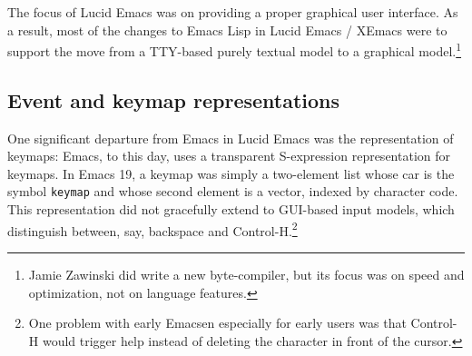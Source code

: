 \documentclass[format=acmsmall, review=false, screen=true]{acmart}
\begin{document}
The focus of Lucid Emacs was on providing a proper graphical user
interface.  As a result, most of the changes to Emacs Lisp in Lucid
Emacs / XEmacs were to support the move from a TTY-based purely
textual model to a graphical model.\footnote{Jamie Zawinski did write a new
  byte-compiler, but its focus was on speed and optimization, not on
  language features.}

\subsection{Event and keymap representations}

One significant departure from Emacs in Lucid Emacs was the
representation of keymaps: Emacs, to this day, uses a transparent
S-expression representation for keymaps.
In Emacs 19, a keymap was
simply a two-element list whose car is the symbol \texttt{keymap} and
whose second element is a vector, indexed by character code.
This
representation did not gracefully extend to GUI-based input models,
which distinguish between, say, backspace and Control-H.\footnote{One
  problem with early Emacsen especially for early users was that
  Control-H would trigger help instead of deleting the character in
  front of the cursor.}
\end{document}
